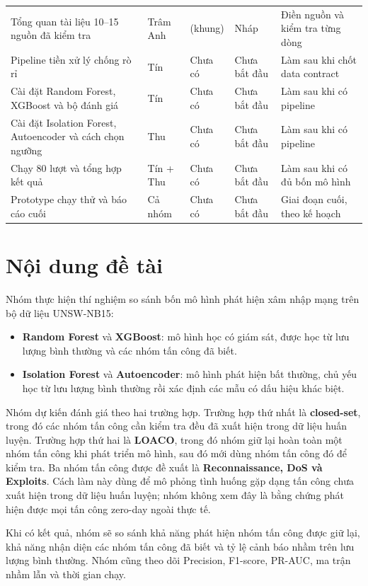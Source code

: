 \documentclass[12pt,a4paper,oneside]{article}
\begin{document}
\begin{longtable}{L{3.5cm}L{2.1cm}L{4.0cm}L{1.9cm}L{2.9cm}}
Tổng quan tài liệu 10--15 nguồn đã kiểm tra & Trâm Anh &  (khung) & Nháp & Điền nguồn và kiểm tra từng dòng\\
Pipeline tiền xử lý chống rò rỉ & Tín & Chưa có & Chưa bắt đầu & Làm sau khi chốt data contract\\
Cài đặt Random Forest, XGBoost và bộ đánh giá & Tín & Chưa có & Chưa bắt đầu & Làm sau khi có pipeline\\
Cài đặt Isolation Forest, Autoencoder và cách chọn ngưỡng & Thu & Chưa có & Chưa bắt đầu & Làm sau khi có pipeline\\
Chạy 80 lượt và tổng hợp kết quả & Tín + Thu & Chưa có & Chưa bắt đầu & Làm sau khi có đủ bốn mô hình\\
Prototype chạy thử và báo cáo cuối & Cả nhóm & Chưa có & Chưa bắt đầu & Giai đoạn cuối, theo kế hoạch\\
\end{longtable}
\normalsize

\section{Nội dung đề tài}

Nhóm thực hiện thí nghiệm so sánh bốn mô hình phát hiện xâm nhập mạng trên bộ dữ liệu UNSW-NB15:
\begin{itemize}[leftmargin=1.05cm,itemsep=0.2em]
\item \textbf{Random Forest} và \textbf{XGBoost}: mô hình học có giám sát, được học từ lưu lượng bình thường và các nhóm tấn công đã biết.
\item \textbf{Isolation Forest} và \textbf{Autoencoder}: mô hình phát hiện bất thường, chủ yếu học từ lưu lượng bình thường rồi xác định các mẫu có dấu hiệu khác biệt.
\end{itemize}

Nhóm dự kiến đánh giá theo hai trường hợp. Trường hợp thứ nhất là \textbf{closed-set}, trong đó các nhóm tấn công cần kiểm tra đều đã xuất hiện trong dữ liệu huấn luyện. Trường hợp thứ hai là \textbf{LOACO}, trong đó nhóm giữ lại hoàn toàn một nhóm tấn công khi phát triển mô hình, sau đó mới dùng nhóm tấn công đó để kiểm tra. Ba nhóm tấn công được đề xuất là \textbf{Reconnaissance, DoS và Exploits}. Cách làm này dùng để mô phỏng tình huống gặp dạng tấn công chưa xuất hiện trong dữ liệu huấn luyện; nhóm không xem đây là bằng chứng phát hiện được mọi tấn công zero-day ngoài thực tế.

Khi có kết quả, nhóm sẽ so sánh khả năng phát hiện nhóm tấn công được giữ lại, khả năng nhận diện các nhóm tấn công đã biết và tỷ lệ cảnh báo nhầm trên lưu lượng bình thường. Nhóm cũng theo dõi Precision, F1-score, PR-AUC, ma trận nhầm lẫn và thời gian chạy.
\end{document}

